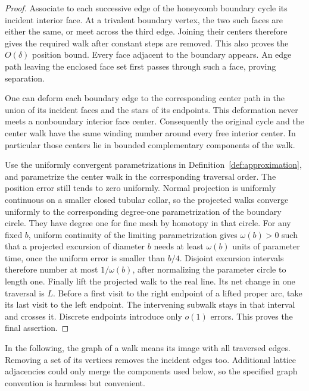 \documentclass[11pt]{article}
\theoremstyle{definition}
\theoremstyle{remark}
\numberwithin{equation}{section}
\begin{document}
\begin{proof}
Associate to each successive edge of the honeycomb boundary cycle its
incident interior face.  At a trivalent boundary vertex, the two such
faces are either the same, or meet across the third edge.  Joining their
centers therefore gives the required walk after constant steps are
removed.  This also proves the $O(\delta)$ position bound.  Every face
adjacent to the boundary appears.  An edge path leaving the enclosed
face set first passes through such a face, proving separation.

One can deform each boundary edge to the corresponding center path in
the union of its incident faces and the stars of its endpoints.  This
deformation never meets a nonboundary interior face center.  Consequently
the original cycle and the center walk have the same winding number
around every free interior center.  In particular those centers lie in
bounded complementary components of the walk.

Use the uniformly convergent parametrizations in
Definition~\ref{def:approximation}, and parametrize the center walk in
the corresponding traversal order.  The position error still tends to
zero uniformly.  Normal projection is uniformly continuous on a smaller
closed tubular collar, so the projected walks converge uniformly to the
corresponding degree-one parametrization of the boundary circle.  They
have degree one for fine mesh by homotopy in that circle.  For any fixed
$b$, uniform continuity of the limiting parametrization gives
$\omega(b)>0$ such that a projected excursion of diameter $b$ needs at
least $\omega(b)$ units of parameter time, once the uniform error is
smaller than $b/4$.  Disjoint excursion intervals therefore number at
most $1/\omega(b)$, after normalizing the parameter circle to length one.
Finally lift the projected walk to the real line.  Its net change in
one traversal is $L$.  Before a first visit to the right endpoint of
a lifted proper arc, take its last visit to the left endpoint.  The
intervening subwalk stays in that interval and crosses it.  Discrete
endpoints introduce only $o(1)$ errors.  This proves the final assertion.
\end{proof}

In the following, the graph of a walk means its image with all traversed
edges.  Removing a set of its vertices removes the incident edges too.
Additional lattice adjacencies could only merge the components used
below, so the specified graph convention is harmless but convenient.
\end{document}
